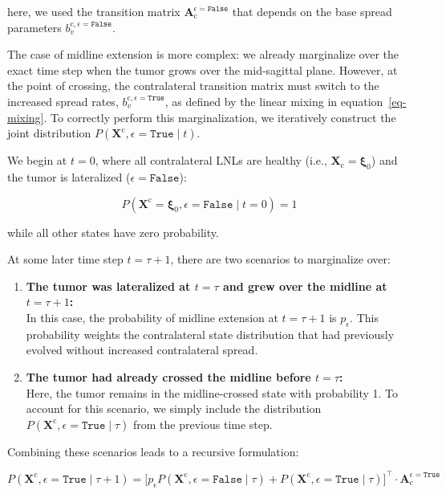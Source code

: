 \documentclass[
  sn-mathphys-num,
]{sn-jnl}
\begin{document}
here, we used the transition matrix
\(\mathbf{A}_\text{c}^{\epsilon=\texttt{False}}\) that depends on the
base spread parameters \(b_v^{\text{c},\epsilon=\texttt{False}}\).

The case of midline extension is more complex: we already marginalize
over the exact time step when the tumor grows over the mid-sagittal
plane. However, at the point of crossing, the contralateral transition
matrix must switch to the increased spread rates,
\(b_v^{\text{c}, \epsilon=\texttt{True}}\), as defined by the linear
mixing in equation~\ref{eq-mixing}. To correctly perform this
marginalization, we iteratively construct the joint distribution
\(P \left( \mathbf{X}^\text{c}, \epsilon=\texttt{True} \mid t \right)\).

We begin at \(t=0\), where all contralateral LNLs are healthy (i.e.,
\(\mathbf{X}_\text{c}=\boldsymbol{\xi}_0\)) and the tumor is lateralized
(\(\epsilon=\texttt{False}\)):

\[
P \left( \mathbf{X}^\text{c} = \boldsymbol{\xi}_0, \epsilon=\texttt{False} \mid t=0 \right) = 1
\]

while all other states have zero probability.

At some later time step \(t=\tau+1\), there are two scenarios to
marginalize over:

\begin{enumerate}
\def\labelenumi{\arabic{enumi}.}
\item
  \textbf{The tumor was lateralized at \(t=\tau\) and grew over the
  midline at \(t=\tau+1\):}\\
  In this case, the probability of midline extension at \(t=\tau+1\) is
  \(p_\epsilon\). This probability weights the contralateral state
  distribution that had previously evolved without increased
  contralateral spread.
\item
  \textbf{The tumor had already crossed the midline before
  \(t=\tau\):}\\
  Here, the tumor remains in the midline-crossed state with probability
  1. To account for this scenario, we simply include the distribution
  \(P\left( \mathbf{X}^\text{c}, \epsilon=\texttt{True} \mid \tau \right)\)
  from the previous time step.
\end{enumerate}

Combining these scenarios leads to a recursive formulation:

\[
P \left( \mathbf{X}^\text{c}, \epsilon=\texttt{True} \mid \tau + 1 \right) = \big[ p_\epsilon P \left( \mathbf{X}^\text{c}, \epsilon=\texttt{False} \mid \tau \right) + P \left( \mathbf{X}^\text{c}, \epsilon=\texttt{True} \mid \tau \right) \big]^\top \cdot \mathbf{A}_\text{c}^{\epsilon=\texttt{True}}
\]
\end{document}
